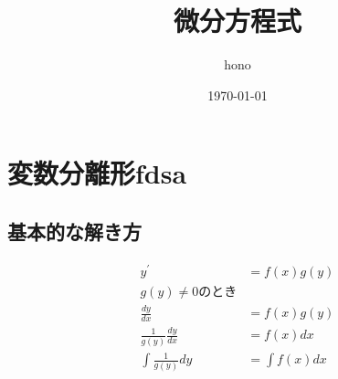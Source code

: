 \documentclass[a4paper]{jarticle}
\title{\Huge 微分方程式}%
\date{\today}%
\author{\quad hono}%
\begin{document}
    \maketitle
    \newpage
    \tableofcontents%
    \newpage











    \section{変数分離形fdsa}

    \subsection{基本的な解き方}
    \begin{align}
        y^\prime &= f(x)g(y)\\
        g(y) \neq 0 のとき \\
        \frac{dy}{dx} &= f(x)g(y)\\
        \frac{1}{g(y)}\frac{dy}{dx} &= f(x)dx\\
        \int \frac{1}{g(y)}dy &= \int f(x)dx
    \end{align}
\end{document}
